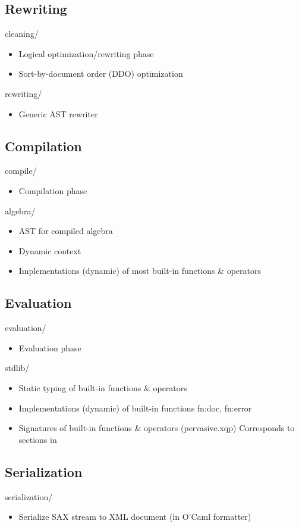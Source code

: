 \subsection{Rewriting}

cleaning/    
\begin{itemize}
\item   Logical optimization/rewriting phase 
\item   Sort-by-document order (DDO) optimization
\end{itemize}
rewriting/    
\begin{itemize}
\item   Generic AST rewriter
\end{itemize}

\subsection{Compilation}
compile/  
\begin{itemize}
\item   Compilation phase 
\end{itemize}
algebra/    
\begin{itemize}
\item   AST for compiled algebra 
\item   Dynamic context
\item   Implementations (dynamic) of most built-in functions \& operators
\end{itemize}

\subsection{Evaluation}
evaluation/
\begin{itemize}
\item   Evaluation phase
\end{itemize}
stdlib/ 
\begin{itemize}
\item   Static typing of built-in functions \& operators 
\item   Implementations (dynamic) of built-in functions fn:doc, fn:error
\item   Signatures of built-in functions \& operators (pervasive.xqp) 
     Corresponds to sections in 
\end{itemize}

\subsection{Serialization}
serialization/
\begin{itemize}
\item   Serialize SAX stream to XML document (in O'Caml formatter)
\end{itemize}

